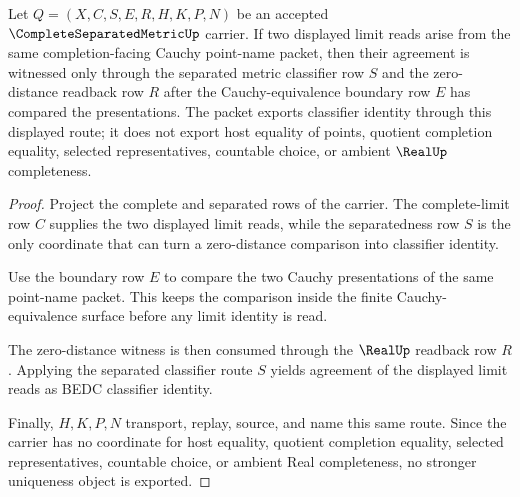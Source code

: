 \begin{theorem}
\label{thm:complete-separated-metric-limit-uniqueness}
Let $Q=(X,C,S,E,R,H,K,P,N)$ be an accepted $\CompleteSeparatedMetricUp$ carrier. If two displayed limit reads arise from the same completion-facing Cauchy point-name packet, then their agreement is witnessed only through the separated metric classifier row $S$ and the zero-distance readback row $R$ after the Cauchy-equivalence boundary row $E$ has compared the presentations. The packet exports classifier identity through this displayed route; it does not export host equality of points, quotient completion equality, selected representatives, countable choice, or ambient $\RealUp$ completeness.
\end{theorem}
\begin{proof}
Project the complete and separated rows of the carrier. The complete-limit row $C$ supplies the two displayed limit reads, while the separatedness row $S$ is the only coordinate that can turn a zero-distance comparison into classifier identity.

Use the boundary row $E$ to compare the two Cauchy presentations of the same point-name packet. This keeps the comparison inside the finite Cauchy-equivalence surface before any limit identity is read.

The zero-distance witness is then consumed through the $\RealUp$ readback row $R$. Applying the separated classifier route $S$ yields agreement of the displayed limit reads as BEDC classifier identity.

Finally, $H,K,P,N$ transport, replay, source, and name this same route. Since the carrier has no coordinate for host equality, quotient completion equality, selected representatives, countable choice, or ambient Real completeness, no stronger uniqueness object is exported.
\end{proof}

\begin{closurestatus}{\CompleteSeparatedMetricUp}
  \theoryclosure{\seedClosure}
  \formalstatus{\unformalizedV}
\end{closurestatus}
